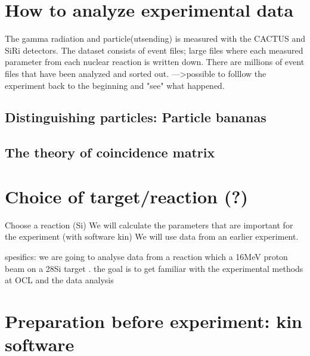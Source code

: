 \documentclass[11pt,a4wide]{article}
\begin{document}



\section{How to analyze experimental data}
The gamma radiation and particle(utsending) is measured with the CACTUS and SiRi detectors. The dataset consists of event files; large files where each measured parameter from each nuclear reaction is written down. There are millions of event files that have been analyzed and sorted out. --->possible to folllow the experiment back to the beginning and "see" what happened.

\subsection{Distinguishing particles: Particle bananas}

\subsection{The theory of coincidence matrix}

\section{Choice of target/reaction (?)}

Choose a reaction (Si)
We will calculate the parameters that are important for the experiment (with software kin)
We will use data from an earlier experiment.


spesifics:
we are going to analyse data from a reaction which a 16MeV proton beam on a 28Si target . the goal is to get familiar with the experimental methods at OCL and the data analysis



\section{Preparation before experiment: kin software}
\end{document}
